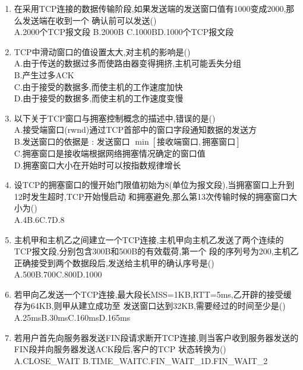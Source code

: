 \documentclass[12pt, a4paper, oneside, UTF8]{ctexbook}
\begin{document}
\begin{enumerate}
    \item 在采用TCP连接的数据传输阶段,如果发送端的发送窗口值有1000变成2000,那么发送端在收到一个
    确认前可以发送() \\
    A.2000个TCP报文段 \qquad B.2000B \qquad C.1000B\qquad D.1000个TCP报文段

    \item TCP中滑动窗口的值设置太大,对主机的影响是() \\
    A.由于传送的数据过多而使路由器变得拥挤,主机可能丢失分组 \\
    B.产生过多ACK \\
    C.由于接受的数据多,而使主机的工作速度加快 \\
    D.由于接受的数据多,而使主机的工作速度变慢 

    \item 以下关于TCP窗口与拥塞控制概念的描述中,错误的是() \\
    A.接受端窗口(rwnd)通过TCP首部中的窗口字段通知数据的发送方 \\
    B.发送窗口的依据是 : 发送窗口 $\min{\left[\text{接收端窗口},\text{拥塞窗口}\right]}$ \\
    C.拥塞窗口是接收端根据网络拥塞情况确定的窗口值 \\
    D.拥塞窗口大小在开始时可以按指数规律增长

    \item 设TCP的拥塞窗口的慢开始门限值初始为8(单位为报文段),当拥塞窗口上升到12时发生超时,TCP开始慢启动
    和拥塞避免,那么第13次传输时候的拥塞窗口大小为() \\
    A.4\qquad B.6\qquad C.7\qquad D.8

    \item 主机甲和主机乙之间建立一个TCP连接,主机甲向主机乙发送了两个连续的TCP报文段,分别包含300B和500B的有效载荷,第一个
    段的序列号为200,主机乙正确接受到两个数据段后,发送给主机甲的确认序号是() \\
    A.500\qquad B.700\qquad C.800\qquad D.1000

    \item 若甲向乙发送一个TCP连接,最大段长MSS=1KB,RTT=5ms,乙开辟的接受缓存为64KB,则甲从建立成功至
    发送窗口达到32KB,需要经过的时间至少是() \\
    A.25ms\qquad B.30ms\qquad C.160ms\qquad D.165ms

    \item 若用户首先向服务器发送FIN段请求断开TCP连接,则当客户收到服务器发送的FIN段并向服务器发送ACK段后,客户的TCP
    状态转换为() \\
    A.CLOSE\_WAIT \qquad B.TIME\_WAIT\qquad C.FIN\_WAIT\_1\qquad D.FIN\_WAIT\_2


\end{enumerate}
\end{document}
